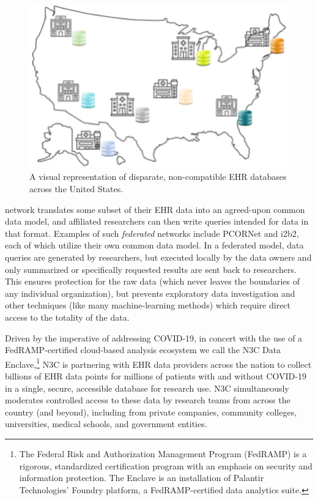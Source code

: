 \documentclass[
  letterpaper,
  DIV=11,
  numbers=noendperiod]{scrreprt}
\begin{document}
\begin{figure}

{\centering \includegraphics[width=1\textwidth,height=\textheight]{chapters/images/intro/image-01-siloed.png}

}

\caption{\label{fig-intro-siloed}A visual representation of disparate,
non-compatible EHR databases across the United States.}

\end{figure}

network translates some subset of their EHR data into an agreed-upon
common data model, and affiliated researchers can then write queries
intended for data in that format. Examples of such \emph{federated}
networks include PCORNet and i2b2, each of which utilize their own
common data model. In a federated model, data queries are generated by
researchers, but executed locally by the data owners and only summarized
or specifically requested results are sent back to researchers. This
ensures protection for the raw data (which never leaves the boundaries
of any individual organization), but prevents exploratory data
investigation and other techniques (like many machine-learning methods)
which require direct access to the totality of the data.

Driven by the imperative of addressing COVID-19, in concert with the use
of a FedRAMP-certified cloud-based analysis ecosystem we call the N3C
Data Enclave,\footnote{The Federal Risk and Authorization Management
  Program (FedRAMP) is a rigorous, standardized certification program
  with an emphasis on security and information protection. The Enclave
  is an installation of Palantir Technologies' Foundry platform, a
  FedRAMP-certified data analytics suite.} N3C is partnering with EHR
data providers across the nation to collect billions of EHR data points
for millions of patients with and without COVID-19 in a single, secure,
accessible database for research use. N3C simultaneously moderates
controlled access to these data by research teams from across the
country (and beyond), including from private companies, community
colleges, universities, medical schools, and government entities.
\end{document}
